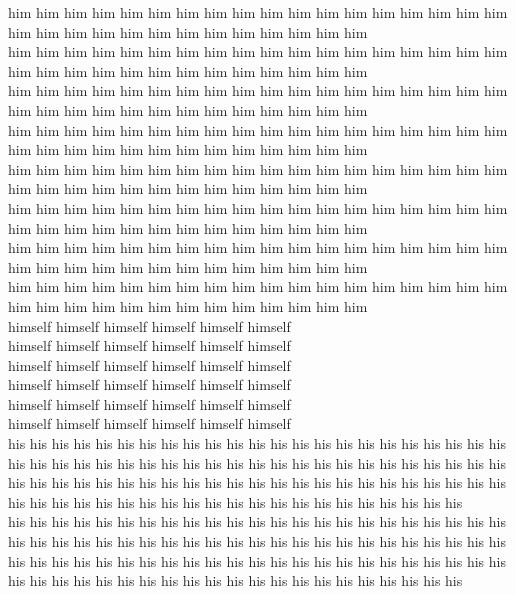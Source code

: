 him him him him him him him him him him him him him him him him him him him him him him him him him him him him him him him\\
him him him him him him him him him him him him him him him him him him him him him him him him him him him him him him him\\
him him him him him him him him him him him him him him him him him him him him him him him him him him him him him him him\\
him him him him him him him him him him him him him him him him him him him him him him him him him him him him him him him\\
him him him him him him him him him him him him him him him him him him him him him him him him him him him him him him him\\
him him him him him him him him him him him him him him him him him him him him him him him him him him him him him him him\\
him him him him him him him him him him him him him him him him him him him him him him him him him him him him him him him\\
him him him him him him him him him him him him him him him him him him him him him him him him him him him him him him him\\
himself himself himself himself himself himself\\
himself himself himself himself himself himself\\
himself himself himself himself himself himself\\
himself himself himself himself himself himself\\
himself himself himself himself himself himself\\
himself himself himself himself himself himself\\
his his his his his his his his his his his his his his his his his his his his his his his his his his his his his his his his his his his his his his his his his his his his his his his his his his his his his his his his his his his his his his his his his his his his his his his his his his his his his his his his his his his his his his his his his his\\
his his his his his his his his his his his his his his his his his his his his his his his his his his his his his his his his his his his his his his his his his his his his his his his his his his his his his his his his his his his his his his his his his his his his his his his his his his his his his his his his his his his his his his his his his his\\
